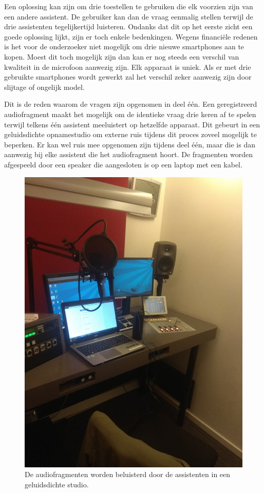 Een oplossing kan zijn om drie toestellen te gebruiken die elk voorzien zijn van een andere assistent. De gebruiker kan dan de vraag eenmalig stellen terwijl de drie assistenten tegelijkertijd luisteren. Ondanks dat dit op het eerste zicht een goede oplossing lijkt, zijn er toch enkele bedenkingen. Wegens financiële redenen is het voor de onderzoeker niet mogelijk om drie nieuwe smartphones aan te kopen. Moest dit toch mogelijk zijn dan kan er nog steeds een verschil van kwaliteit in de microfoon aanwezig zijn. Elk apparaat is uniek. Als er met drie gebruikte smartphones wordt gewerkt zal het verschil zeker aanwezig zijn door slijtage of ongelijk model.

Dit is de reden waarom de vragen zijn opgenomen in deel één. Een geregistreerd audiofragment maakt het mogelijk om de identieke vraag drie keren af te spelen terwijl telkens één assistent meeluistert op hetzelfde apparaat. Dit gebeurt in een geluidsdichte opnamestudio om externe ruis tijdens dit proces zoveel mogelijk te beperken. Er kan wel ruis mee opgenomen zijn tijdens deel één, maar die is dan aanwezig bij elke assistent die het audiofragment hoort. De fragmenten worden afgespeeld door een speaker die aangesloten is op een laptop met een kabel.

\begin{figure}[h]
    \includegraphics[width=0.7\linewidth]{img/proefafname3}
    \caption{De audiofragmenten worden beluisterd door de assistenten in een geluidsdichte studio.}
    \label{fig:proefafname2}
\end{figure}

